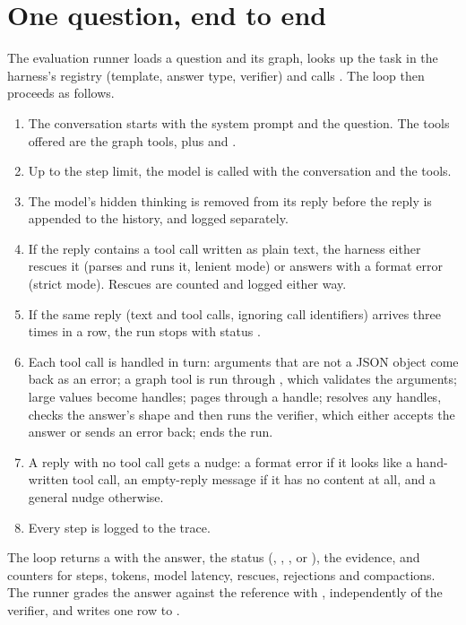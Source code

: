 \section{One question, end to end}
\label{sec:one-question}

The evaluation runner loads a question and its graph, looks up the task in the harness's registry (template, answer
type, verifier) and calls . The loop then proceeds as follows.

\begin{enumerate}
  \item The conversation starts with the system prompt and the question. The tools offered are the graph tools, plus
         and .
  \item Up to the step limit, the model is called with the conversation and the tools.
  \item The model's hidden thinking is removed from its reply before the reply is appended to the history, and logged
        separately.
  \item If the reply contains a tool call written as plain text, the harness either rescues it (parses and runs it,
        lenient mode) or answers with a format error (strict mode). Rescues are counted and logged either way.
  \item If the same reply (text and tool calls, ignoring call identifiers) arrives three times in a row, the run stops
        with status .
  \item Each tool call is handled in turn: arguments that are not a JSON object come back as an error; a graph tool
        is run through , which validates the arguments; large values become handles;
         pages through a handle;  resolves any handles, checks the answer's
        shape and then runs the verifier, which either accepts the answer or sends an error back; 
        ends the run.
  \item A reply with no tool call gets a nudge: a format error if it looks like a hand-written tool call, an
        empty-reply message if it has no content at all, and a general nudge otherwise.
  \item Every step is logged to the trace.
\end{enumerate}

The loop returns a  with the answer, the status (, ,
,  or ), the evidence, and counters for steps, tokens, model
latency, rescues, rejections and compactions. The runner grades the answer against the reference with
, independently of the verifier, and writes one row to .

